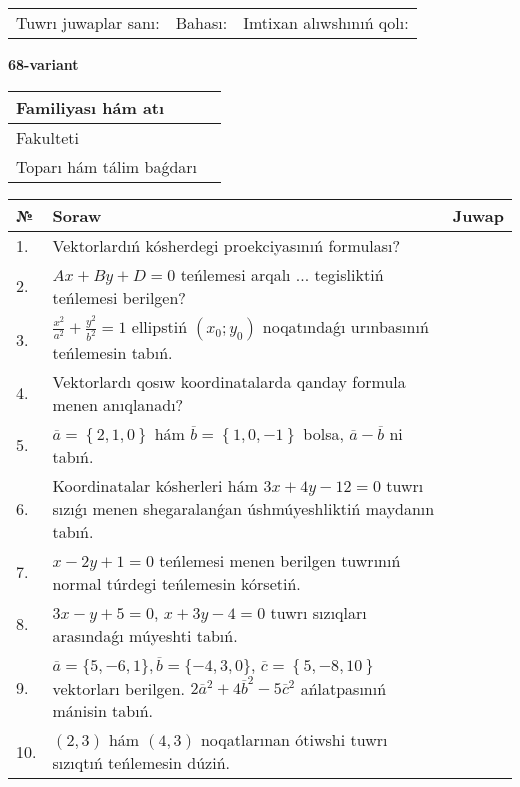 \documentclass{article}
\begin{document}
\vspace{1cm}

\begin{tabular}{lll}
Tuwrı juwaplar sanı: \underline{\hspace{1.5cm}} & 
Bahası: \underline{\hspace{1.5cm}} & 
Imtixan alıwshınıń qolı: \underline{\hspace{2cm}} \\
\end{tabular}

\egroup

\newpage


\textbf{68-variant}\\

\bgroup
\def\arraystretch{1.6} %

\begin{tabular}{|m{5.7cm}|m{9.5cm}|}
\hline
Familiyası hám atı & \\
\hline
Fakulteti  & \\
\hline
Toparı hám tálim baǵdarı  & \\
\hline
\end{tabular}

\vspace{1cm}

\begin{tabular}{|m{0.7cm}|m{10cm}|m{4cm}|}
\hline
№ & Soraw & Juwap \\
\hline
1. & Vektorlardıń kósherdegi proekciyasınıń formulası? &  \\
\hline
2. & $Ax+By+D=0$ teńlemesi arqalı ... tegisliktiń teńlemesi berilgen? &  \\
\hline
3. & $\frac{x^2}{a^2}+\frac{y^2}{b^2}=1$ ellipstiń $(x_0;y_0)$ noqatındaǵı urınbasınıń teńlemesin tabıń. &  \\
\hline
4. & Vektorlardı qosıw koordinatalarda qanday formula menen anıqlanadı? &  \\
\hline
5. & $\overline{a}=\left\{ 2, 1, 0 \right\}$ hám $\overline{b}=\left\{ 1, 0,-1 \right\}$ bolsa, $\overline{a}-\overline{b}$ ni tabıń. &  \\
\hline
6. & Koordinatalar kósherleri hám $ 3x+4y-12=0 $ tuwrı sızıǵı menen shegaralanǵan úshmúyeshliktiń maydanın tabıń. &  \\
\hline
7. & $x-2y+1=0$ teńlemesi menen berilgen tuwrınıń normal túrdegi teńlemesin kórsetiń. &  \\
\hline
8. & $3x-y+5=0$, $x+3y-4=0$ tuwrı sızıqları arasındaǵı múyeshti tabıń. &  \\
\hline
9. & $\overline{a}=\{5,-6, 1 \}, \overline{b}=\{-4, 3, 0 \} $, $\overline{c}=\left\{ 5,-8, 10 \right\}$ vektorları berilgen. $2{\overline{a}}^{2}+4{\overline{b}}^{2}-5{\overline{c}}^{2}$ ańlatpasınıń mánisin tabıń. &  \\
\hline
10. & $(2, 3)$ hám $(4, 3)$ noqatlarınan ótiwshi tuwrı sızıqtıń teńlemesin dúziń. &  \\
\hline
\end{tabular}
\end{document}
